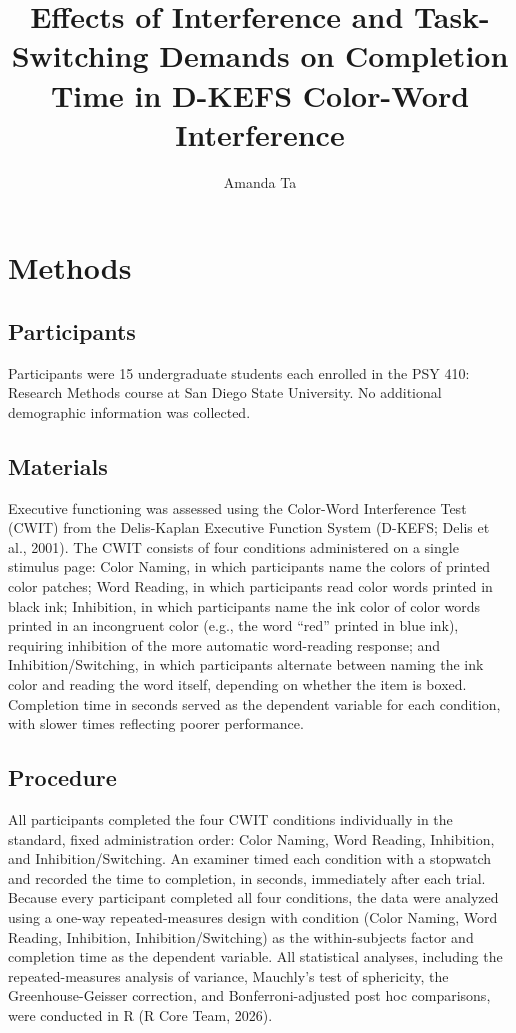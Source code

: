 \documentclass[stu,floatsintext]{apa7}
\title{Effects of Interference and Task-Switching Demands on Completion Time in D-KEFS Color-Word Interference}
\author{Amanda Ta}
\affiliation{Department of Psychology, San Diego State University}
\begin{document}
\maketitle

\section{Methods}

\subsection{Participants}

Participants were 15 undergraduate students each enrolled in the PSY 410: Research Methods course at San Diego State University. No additional demographic information was collected.

\subsection{Materials}

Executive functioning was assessed using the Color-Word Interference Test (CWIT) from the Delis-Kaplan Executive Function System (D-KEFS; Delis et al., 2001). The CWIT consists of four conditions administered on a single stimulus page: Color Naming, in which participants name the colors of printed color patches; Word Reading, in which participants read color words printed in black ink; Inhibition, in which participants name the ink color of color words printed in an incongruent color (e.g., the word ``red'' printed in blue ink), requiring inhibition of the more automatic word-reading response; and Inhibition/Switching, in which participants alternate between naming the ink color and reading the word itself, depending on whether the item is boxed. Completion time in seconds served as the dependent variable for each condition, with slower times reflecting poorer performance.

\subsection{Procedure}

All participants completed the four CWIT conditions individually in the standard, fixed administration order: Color Naming, Word Reading, Inhibition, and Inhibition/Switching. An examiner timed each condition with a stopwatch and recorded the time to completion, in seconds, immediately after each trial. Because every participant completed all four conditions, the data were analyzed using a one-way repeated-measures design with condition (Color Naming, Word Reading, Inhibition, Inhibition/Switching) as the within-subjects factor and completion time as the dependent variable. All statistical analyses, including the repeated-measures analysis of variance, Mauchly's test of sphericity, the Greenhouse-Geisser correction, and Bonferroni-adjusted post hoc comparisons, were conducted in R (R Core Team, 2026).
\end{document}

